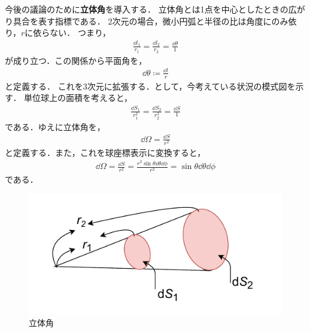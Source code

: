 \documentclass{report}
\begin{document}
  今後の議論のために\textbf{立体角}を導入する．
  立体角とは1点を中心としたときの広がり具合を表す指標である．
  2次元の場合，微小円弧と半径の比は角度にのみ依り，$r$に依らない．
  つまり，
  \begin{align}
    \frac{\dd{l_1}}{r_1} = \frac{\dd{l_2}}{r_2} = \frac{\dd{\theta}}{1}
  \end{align}
  が成り立つ．この関係から平面角を，
  \begin{align}
    \dd{\theta} \coloneqq \frac{\dd{l}}{r}
  \end{align}
  と定義する．
  これを3次元に拡張する．として，今考えている状況の模式図を示す．
  単位球上の面積を考えると，
  \begin{align}
    \frac{\dd{S_1}}{r_1^2} = \frac{\dd{S_2}}{r_2^2} = \frac{\dd{S}}{1}
  \end{align}
  である．ゆえに立体角を，
  \begin{align}
    \dd{\Omega} = \frac{\dd{S}}{r^2} \label{solid-angle-def}
  \end{align}
  と定義する．また，これを球座標表示に変換すると，
  \begin{align}
    \dd{\Omega} = \frac{\dd{S}}{r^2} = \frac{r^2\sin\theta\dd{\theta}\dd{\phi}}{r^2} = \sin\theta\dd{\theta}\dd{\phi}
  \end{align}
  である．
  \begin{figure}[H]
    \centering
    \includegraphics[width = 0.6\columnwidth]{fig/solid_angle.pdf}
    \caption{立体角}\label{solid_angle}
  \end{figure}
\end{document}
